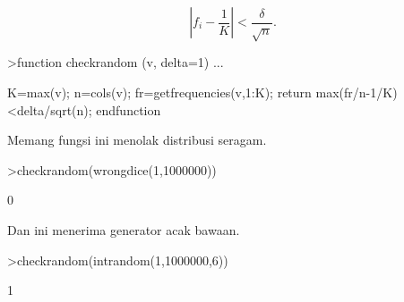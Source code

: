 \documentclass[a4paper,10pt]{article}
\begin{document}
\begin{eulernotebook}
\begin{eulercomment}
\begin{eulercomment}
\begin{eulercomment}
\begin{eulercomment}
\begin{eulercomment}
\begin{eulercomment}
\begin{eulercomment}
\begin{eulercomment}
\begin{eulercomment}
\begin{eulercomment}
\begin{eulercomment}
\begin{eulercomment}
\begin{eulercomment}
\begin{eulercomment}
\begin{eulercomment}
\begin{eulercomment}
\begin{eulercomment}
\begin{eulercomment}
\begin{eulercomment}
\begin{eulercomment}
\begin{eulercomment}
\begin{eulercomment}
\begin{eulercomment}
\begin{eulercomment}
\begin{eulercomment}
\begin{eulercomment}
\begin{eulercomment}
\begin{eulercomment}
\begin{eulercomment}
\begin{eulercomment}
\begin{eulercomment}
\begin{eulercomment}
\begin{eulercomment}
\begin{eulercomment}
\begin{eulercomment}
\begin{eulercomment}
\begin{eulercomment}
\begin{eulercomment}
\begin{eulercomment}
\begin{eulercomment}
\begin{eulercomment}
\begin{eulercomment}
\begin{eulercomment}
\begin{eulercomment}
\begin{eulercomment}
\end{eulercomment}
\begin{eulerformula}
\[
\left|f_i-\frac{1}{K}\right| < \frac{\delta}{\sqrt{n}}.
\]
\end{eulerformula}
\begin{eulerprompt}
>function checkrandom (v, delta=1) ...
\end{eulerprompt}
\begin{eulerudf}
    K=max(v); n=cols(v);
    fr=getfrequencies(v,1:K);
    return max(fr/n-1/K)<delta/sqrt(n);
    endfunction
\end{eulerudf}
\begin{eulercomment}
Memang fungsi ini menolak distribusi seragam.
\end{eulercomment}
\begin{eulerprompt}
>checkrandom(wrongdice(1,1000000))
\end{eulerprompt}
\begin{euleroutput}
  0
\end{euleroutput}
\begin{eulercomment}
Dan ini menerima generator acak bawaan.
\end{eulercomment}
\begin{eulerprompt}
>checkrandom(intrandom(1,1000000,6))
\end{eulerprompt}
\begin{euleroutput}
  1
\end{euleroutput}

\end{eulercomment}
\end{eulercomment}
\end{eulercomment}
\end{eulercomment}
\end{eulercomment}
\end{eulercomment}
\end{eulercomment}
\end{eulercomment}
\end{eulercomment}
\end{eulercomment}
\end{eulercomment}
\end{eulercomment}
\end{eulercomment}
\end{eulercomment}
\end{eulercomment}
\end{eulercomment}
\end{eulercomment}
\end{eulercomment}
\end{eulercomment}
\end{eulercomment}
\end{eulercomment}
\end{eulercomment}
\end{eulercomment}
\end{eulercomment}
\end{eulercomment}
\end{eulercomment}
\end{eulercomment}
\end{eulercomment}
\end{eulercomment}
\end{eulercomment}
\end{eulercomment}
\end{eulercomment}
\end{eulercomment}
\end{eulercomment}
\end{eulercomment}
\end{eulercomment}
\end{eulercomment}
\end{eulercomment}
\end{eulercomment}
\end{eulercomment}
\end{eulercomment}
\end{eulercomment}
\end{eulercomment}
\end{eulercomment}
\end{eulernotebook}
\end{document}
